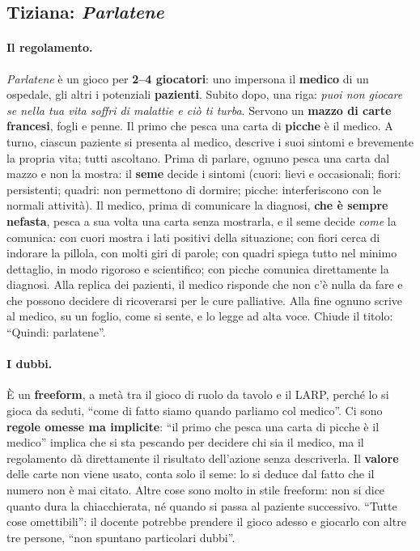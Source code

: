 \subsection{Tiziana: \emph{Parlatene}}
\label{a6:sec:parlatene}

\paragraph{Il regolamento.} \emph{Parlatene} è un gioco per \textbf{2--4
giocatori}: uno impersona il \textbf{medico} di un ospedale, gli altri i potenziali
\textbf{pazienti}. Subito dopo, una riga: \emph{puoi non giocare se nella tua vita
soffri di malattie e ciò ti turba}. Servono un \textbf{mazzo di carte francesi},
fogli e penne. Il primo che pesca una carta di \textbf{picche} è il medico. A turno,
ciascun paziente si presenta al medico, descrive i suoi sintomi e brevemente la
propria vita; tutti ascoltano. Prima di parlare, ognuno pesca una carta dal mazzo e
non la mostra: il \textbf{seme} decide i sintomi (cuori: lievi e occasionali; fiori:
persistenti; quadri: non permettono di dormire; picche: interferiscono con le normali
attività). Il medico, prima di comunicare la diagnosi, \textbf{che è sempre
nefasta}, pesca a sua volta una carta senza mostrarla, e il seme decide \emph{come}
la comunica: con cuori mostra i lati positivi della situazione; con fiori cerca di
indorare la pillola, con molti giri di parole; con quadri spiega tutto nel minimo
dettaglio, in modo rigoroso e scientifico; con picche comunica direttamente la
diagnosi. Alla replica dei pazienti, il medico risponde che non c'è nulla da fare e
che possono decidere di ricoverarsi per le cure palliative. Alla fine ognuno scrive al
medico, su un foglio, come si sente, e lo legge ad alta voce. Chiude il titolo:
``Quindi: parlatene''.

\paragraph{I dubbi.} È un \textbf{freeform}, a metà tra il gioco di ruolo da tavolo
e il LARP, perché lo si gioca da seduti, ``come di fatto siamo quando parliamo col
medico''. Ci sono \textbf{regole omesse ma implicite}: ``il primo che pesca una carta
di picche è il medico'' implica che si sta pescando per decidere chi sia il medico,
ma il regolamento dà direttamente il risultato dell'azione senza descriverla. Il
\textbf{valore} delle carte non viene usato, conta solo il seme: lo si deduce dal
fatto che il numero non è mai citato. Altre cose sono molto in stile freeform: non si
dice quanto dura la chiacchierata, né quando si passa al paziente successivo. ``Tutte
cose omettibili'': il docente potrebbe prendere il gioco adesso e giocarlo con altre
tre persone, ``non spuntano particolari dubbi''.

